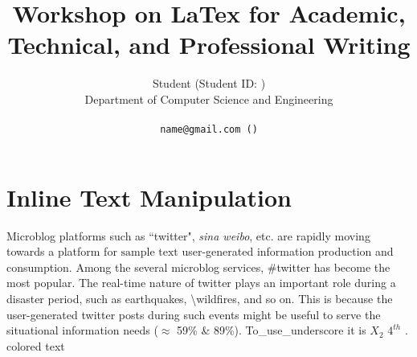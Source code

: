\documentclass[11pt]{article}
\title{Workshop on LaTex for Academic, Technical, and Professional Writing}
\author{Student (Student ID:  ) \\
  Department of Computer Science and Engineering \\
  \affaddr{University of Chittagong, Chittagong, Bangladesh}\\
  {\tt name@gmail.com (\Letter)} \\
}
\begin{document}

\maketitle
\thispagestyle{plain}
\pagestyle{plain}

\section{Inline Text Manipulation}
\label{ref:inlineText}
Microblog platforms such as ``twitter", \emph{sina weibo}, etc. are rapidly moving towards a platform for $\mbox{sample text}$ user-generated information production and consumption. Among the several microblog services, \#twitter has become the most popular. The real-time nature of twitter plays an {\color{red} important role during a disaster period}, such as earthquakes, \textbackslash{wildfires}, and so on. This is because the user-generated twitter posts during such events might be useful to serve the situational information needs ($\approx$ 59\% \& 89\%). To\_use\_underscore it is $X_{2}$ $4^{th}$ .
{\color{blue} colored text}
\end{document}
